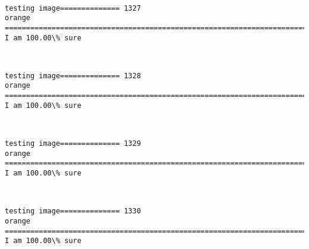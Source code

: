 \documentclass[11pt]{article}
\begin{document}
    \begin{center}
    \end{center}
    { \hspace*{\fill} \\}
    
    \begin{Verbatim}[commandchars=\\\{\}]
testing image============== 1327
orange
============================================================================
I am 100.00\% sure

    \end{Verbatim}

    \begin{center}
    \end{center}
    { \hspace*{\fill} \\}
    
    \begin{Verbatim}[commandchars=\\\{\}]
testing image============== 1328
orange
============================================================================
I am 100.00\% sure

    \end{Verbatim}

    \begin{center}
    \end{center}
    { \hspace*{\fill} \\}
    
    \begin{Verbatim}[commandchars=\\\{\}]
testing image============== 1329
orange
============================================================================
I am 100.00\% sure

    \end{Verbatim}

    \begin{center}
    \end{center}
    { \hspace*{\fill} \\}
    
    \begin{Verbatim}[commandchars=\\\{\}]
testing image============== 1330
orange
============================================================================
I am 100.00\% sure

    \end{Verbatim}
\end{document}
